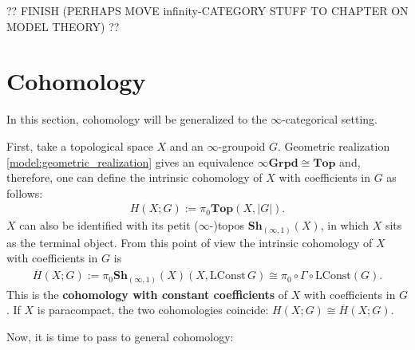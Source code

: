     ?? FINISH (PERHAPS MOVE infinity-CATEGORY STUFF TO CHAPTER ON MODEL THEORY) ??

\section{Cohomology}

    In this section, cohomology will be generalized to the $\infty$-categorical setting.

    First, take a topological space $X$ and an $\infty$-groupoid $G$. Geometric realization \ref{model:geometric_realization} gives an equivalence $\infty\mathbf{Grpd}\cong\mathbf{Top}$ and, therefore, one can define the intrinsic cohomology of $X$ with coefficients in $G$ as follows:
    \begin{gather}
        H(X;G) := \pi_0\mathbf{Top}(X,|G|).
    \end{gather}
    $X$ can also be identified with its petit ($\infty$-)topos $\mathbf{Sh}_{(\infty,1)}(X)$, in which $X$ sits as the terminal object. From this point of view the intrinsic cohomology of $X$ with coefficients in $G$ is
    \begin{gather}
        \overline{H}(X;G) := \pi_0\mathbf{Sh}_{(\infty,1)}(X)(X,\mathrm{LConst}\,G)\cong\pi_0\circ\Gamma\circ\mathrm{LConst}(G).
    \end{gather}
    This is the \textbf{cohomology with constant coefficients} of $X$ with coefficients in $G$. If $X$ is paracompact, the two cohomologies coincide: $H(X;G)\cong\overline{H}(X;G)$.

    Now, it is time to pass to general cohomology:

